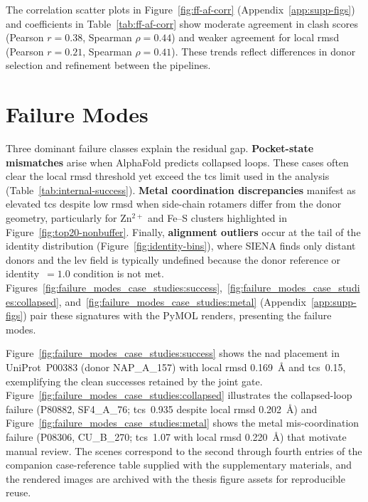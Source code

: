 The correlation scatter plots in Figure~\ref{fig:ff-af-corr} (Appendix~\ref{app:supp-figs}) and coefficients in Table~\ref{tab:ff-af-corr} show moderate agreement in clash scores (Pearson $r=0.38$, Spearman $\rho=0.44$) and weaker agreement for local \gls{rmsd} (Pearson $r=0.21$, Spearman $\rho=0.41$). These trends reflect differences in donor selection and refinement between the pipelines.







\section{Failure Modes}
\label{sec:results-failure-modes}
Three dominant failure classes explain the residual gap. \textbf{Pocket-state mismatches} arise when AlphaFold predicts collapsed loops. These cases often clear the local \gls{rmsd} threshold yet exceed the \gls{tcs} limit used in the analysis (Table~\ref{tab:internal-success}). \textbf{Metal coordination discrepancies} manifest as elevated \gls{tcs} despite low \gls{rmsd} when side-chain rotamers differ from the donor geometry, particularly for Zn$^{2+}$ and Fe--S clusters highlighted in Figure~\ref{fig:top20-nonbuffer}. Finally, \textbf{alignment outliers} occur at the tail of the identity distribution (Figure~\ref{fig:identity-bins}), where SIENA finds only distant donors and the \gls{lev} field is typically undefined because the donor reference or identity~$=1.0$ condition is not met. Figures~\ref{fig:failure_modes_case_studies:success},~\ref{fig:failure_modes_case_studies:collapsed}, and~\ref{fig:failure_modes_case_studies:metal} (Appendix~\ref{app:supp-figs}) pair these signatures with the PyMOL renders, presenting the failure modes.

Figure~\ref{fig:failure_modes_case_studies:success} shows the \gls{nad} placement in UniProt~P00383 (donor NAP\_A\_157) with local \gls{rmsd} \SI{0.169}{\angstrom} and \gls{tcs}~0.15, exemplifying the clean successes retained by the joint gate. Figure~\ref{fig:failure_modes_case_studies:collapsed} illustrates the collapsed-loop failure (P80882, SF4\_A\_76; \gls{tcs}~0.935 despite local \gls{rmsd} \SI{0.202}{\angstrom}) and Figure~\ref{fig:failure_modes_case_studies:metal} shows the metal mis-coordination failure (P08306, CU\_B\_270; \gls{tcs}~1.07 with local \gls{rmsd} \SI{0.220}{\angstrom}) that motivate manual review. The scenes correspond to the second through fourth entries of the companion case-reference table supplied with the supplementary materials, and the rendered images are archived with the thesis figure assets for reproducible reuse.

